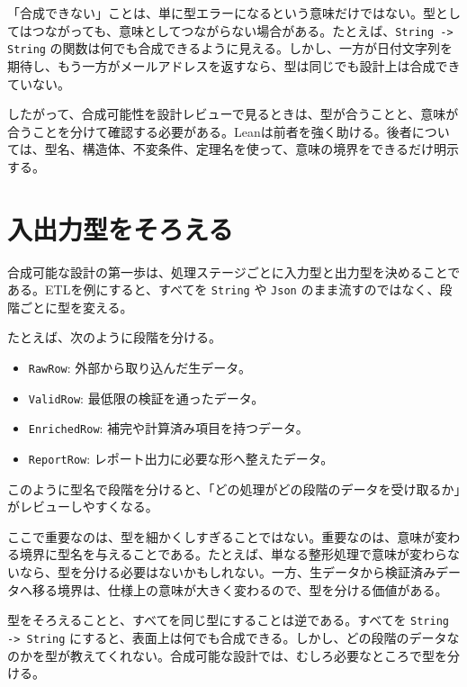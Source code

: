 \begin{softwarebox}
「合成できない」ことは、単に型エラーになるという意味だけではない。型としてはつながっても、意味としてつながらない場合がある。たとえば、\texttt{String -> String} の関数は何でも合成できるように見える。しかし、一方が日付文字列を期待し、もう一方がメールアドレスを返すなら、型は同じでも設計上は合成できていない。
\end{softwarebox}

したがって、合成可能性を設計レビューで見るときは、型が合うことと、意味が合うことを分けて確認する必要がある。Leanは前者を強く助ける。後者については、型名、構造体、不変条件、定理名を使って、意味の境界をできるだけ明示する。

\section{入出力型をそろえる}

合成可能な設計の第一歩は、処理ステージごとに入力型と出力型を決めることである。ETLを例にすると、すべてを \texttt{String} や \texttt{Json} のまま流すのではなく、段階ごとに型を変える。

\begin{softwarebox}
たとえば、次のように段階を分ける。
\begin{itemize}
\item \texttt{RawRow}: 外部から取り込んだ生データ。
\item \texttt{ValidRow}: 最低限の検証を通ったデータ。
\item \texttt{EnrichedRow}: 補完や計算済み項目を持つデータ。
\item \texttt{ReportRow}: レポート出力に必要な形へ整えたデータ。
\end{itemize}
このように型名で段階を分けると、「どの処理がどの段階のデータを受け取るか」がレビューしやすくなる。
\end{softwarebox}


ここで重要なのは、型を細かくしすぎることではない。重要なのは、意味が変わる境界に型名を与えることである。たとえば、単なる整形処理で意味が変わらないなら、型を分ける必要はないかもしれない。一方、生データから検証済みデータへ移る境界は、仕様上の意味が大きく変わるので、型を分ける価値がある。

\begin{warningbox}
型をそろえることと、すべてを同じ型にすることは逆である。すべてを \texttt{String -> String} にすると、表面上は何でも合成できる。しかし、どの段階のデータなのかを型が教えてくれない。合成可能な設計では、むしろ必要なところで型を分ける。
\end{warningbox}

